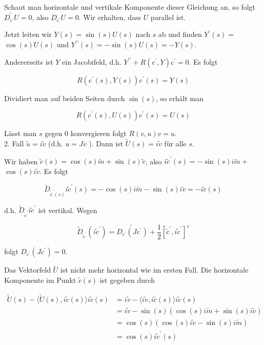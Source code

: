 \documentclass[10pt, letterpaper]{article}
\begin{document}
Schaut man horizontale und vertikale Komponente dieser Gleichung an, so folgt $\widetilde{D_{c^{\prime}} U}=0$, also $D_{c^{\prime}} U=0$. Wir erhalten, dass $U$ parallel ist.

Jetzt leiten wir $Y(s)=\sin (s) U(s)$ nach $s$ ab und finden $Y^{\prime}(s)=$ $\cos (s) U(s)$ und $Y^{\prime \prime}(s)=-\sin (s) U(s)=-Y(s)$.

Andererseits ist $Y$ ein Jacobifeld, d.h. $Y^{\prime \prime}+R\left(c^{\prime}, Y\right) c^{\prime}=0$. Es folgt

$$
R\left(c^{\prime}(s), Y(s)\right) c^{\prime}(s)=Y(s)
$$

Dividiert man auf beiden Seiten durch $\sin (s)$, so erhält man

$$
R\left(c^{\prime}(s), U(s)\right) c^{\prime}(s)=U(s)
$$

Lässt man $s$ gegen 0 konvergieren folgt $R(v, u) v=u$.\\
2. Fall $\tilde{u}=i \tilde{v}$ (d.h. $u=J v$ ). Dann ist $\tilde{U}(s)=i \tilde{v}$ für alle $s$.

Wir haben $\tilde{c}(s)=\cos (s) \tilde{m}+\sin (s) \tilde{v}$, also $i \tilde{c}^{\prime}(s)=-\sin (s) i \tilde{m}+$ $\cos (s) i \tilde{v}$. Es folgt

$$
\tilde{D}_{\tilde{c}^{\prime}(s)} i \tilde{c}^{\prime}(s)=-\cos (s) i \tilde{m}-\sin (s) i \tilde{v}=-i \tilde{c}(s)
$$

d.h. $\tilde{D}_{\tilde{c}^{\prime}} i \tilde{c}^{\prime}$ ist vertikal. Wegen

$$
\tilde{D}_{\tilde{c}^{\prime}}\left(i \tilde{c}^{\prime}\right)=\widetilde{D_{c^{\prime}}\left(J c^{\prime}\right)}+\frac{1}{2}\left[\tilde{c}^{\prime}, i \tilde{c}^{\prime}\right]^{v}
$$

folgt $D_{c^{\prime}}\left(J c^{\prime}\right)=0$.

Das Vektorfeld $\tilde{U}$ ist nicht mehr horizontal wie im ersten Fall. Die horizontale Komponente im Punkt $\tilde{c}(s)$ ist gegeben durch

$$
\begin{aligned}
\tilde{U}(s)-\langle\tilde{U}(s), i \tilde{c}(s)\rangle i \tilde{c}(s) & =i \tilde{v}-\langle i \tilde{v}, i \tilde{c}(s)\rangle i \tilde{c}(s) \\
& =i \tilde{v}-\sin (s)(\cos (s) i \tilde{m}+\sin (s) i \tilde{v}) \\
& =\cos (s)(\cos (s) i \tilde{v}-\sin (s) i \tilde{m}) \\
& =\cos (s) i \tilde{c}^{\prime}(s)
\end{aligned}
$$
\end{document}
